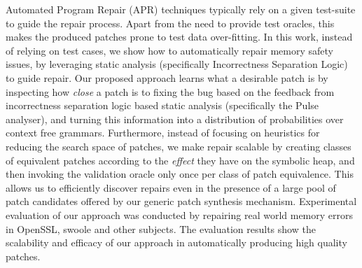Automated Program Repair (APR) techniques typically rely on a given test-suite to guide the repair process. Apart from the need to provide test oracles, this makes the produced patches prone to test data over-fitting. In this work, instead of relying on test cases, we show how to automatically repair memory safety issues, by leveraging static analysis (specifically Incorrectness Separation Logic) to guide repair.
Our proposed approach learns what a desirable patch is by inspecting how \emph{close}  a patch is to fixing the bug based on the feedback from incorrectness separation logic based static analysis (specifically the Pulse analyser), and turning this information into a distribution of probabilities over context free grammars.  Furthermore, instead of focusing on heuristics for reducing the search space  of patches, we make repair scalable by creating classes of equivalent patches according to the \emph{effect} they have on the symbolic heap, and then invoking the validation oracle  only once per class of patch equivalence. This allows us to efficiently discover repairs even in the presence of a large pool of patch candidates offered by our generic patch synthesis mechanism. Experimental evaluation of our approach was conducted by repairing real world memory errors in OpenSSL, swoole and other subjects. The evaluation results show  the scalability and efficacy of our approach in automatically producing high quality patches.